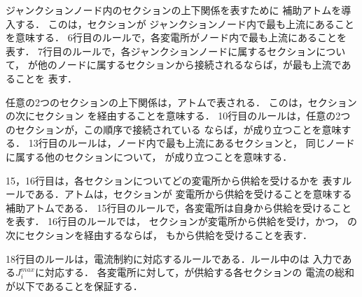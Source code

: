ジャンクションノード内のセクションの上下関係を表すために
補助アトムを導入する．
このは，セクションが
ジャンクションノード内で最も上流にあることを意味する．
6行目のルールで，各変電所がノード内で最も上流にあることを
表す．
7行目のルールで，各ジャンクションノードに属するセクションについて，
が他のノードに属するセクションから接続されるならば，が最も上流であることを
表す．

任意の2つのセクションの上下関係は，アトムで表される．
このは，セクションの次にセクション
を経由することを意味する．
10行目のルールは，任意の2つのセクションが，この順序で接続されている
ならば，が成り立つことを意味する．
13行目のルールは，ノード内で最も上流にあるセクションと，
同じノードに属する他のセクションについて，
が成り立つことを意味する．

15，16行目は，各セクションについてどの変電所から供給を受けるかを
表すルールである．アトムは，セクションが
変電所から供給を受けることを意味する補助アトムである．
15行目のルールで，各変電所は自身から供給を受けることを表す．
16行目のルールでは，
セクションが変電所から供給を受け，かつ，
の次にセクションを経由するならば，
もから供給を受けることを表す．

18行目のルールは，電流制約に対応するルールである．ルール中のは
入力である$J_i^{max}$に対応する．
各変電所に対して，が供給する各セクションの
電流の総和が以下であることを保証する．


